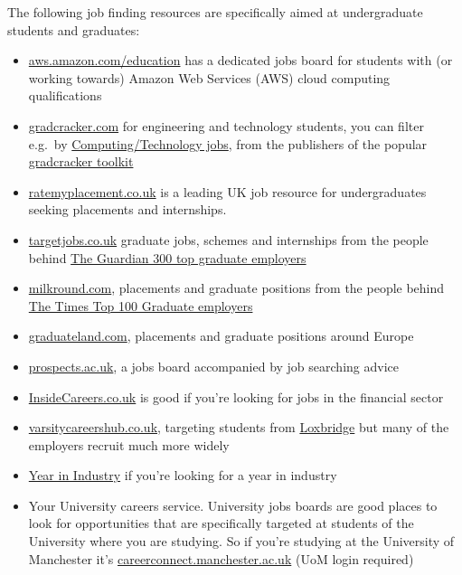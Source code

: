 \documentclass[
]{book}
\providecommand{\tightlist}{%
  \setlength{\itemsep}{0pt}\setlength{\parskip}{0pt}}
\begin{document}
The following job finding resources are specifically aimed at undergraduate students and graduates:

\begin{itemize}
\tightlist
\item
  \href{https://aws.amazon.com/education/awseducate/aws-educate-job-board/}{aws.amazon.com/education} has a dedicated jobs board for students with (or working towards) Amazon Web Services (AWS) cloud computing qualifications
\item
  \href{http://www.gradcracker.com/}{gradcracker.com} for engineering and technology students, you can filter e.g.~by \href{https://www.gradcracker.com/search/computing-technology/jobs}{Computing/Technology jobs}, from the publishers of the popular \href{http://www.gradcracker.com/career-centre/toolkit}{gradcracker toolkit}
\item
  \href{http://www.ratemyplacement.co.uk/}{ratemyplacement.co.uk} is a leading UK job resource for undergraduates seeking placements and internships.
\item
  \href{http://www.targetjobs.co.uk/}{targetjobs.co.uk} graduate jobs, schemes and internships from the people behind \href{https://targetjobs.co.uk/uk300}{The Guardian 300 top graduate employers}
\item
  \href{http://www.milkround.com/}{milkround.com}, placements and graduate positions from the people behind \href{https://digital.top100graduateemployers.com/view/979434180/}{The Times Top 100 Graduate employers}
\item
  \href{https://graduateland.com/}{graduateland.com}, placements and graduate positions around Europe
\item
  \href{https://www.prospects.ac.uk/}{prospects.ac.uk}, a jobs board accompanied by job searching advice
\item
  \href{https://www.insidecareers.co.uk}{InsideCareers.co.uk} is good if you're looking for jobs in the financial sector
\item
  \href{https://www.varsitycareershub.co.uk/}{varsitycareershub.co.uk}, targeting students from \href{https://en.wikipedia.org/wiki/Loxbridge}{Loxbridge} but many of the employers recruit much more widely
\item
  \href{https://www.etrust.org.uk/yini-vacancies}{Year in Industry} if you're looking for a year in industry
\item
  Your University careers service. University jobs boards are good places to look for opportunities that are specifically targeted at students of the University where you are studying. So if you're studying at the University of Manchester it's \href{https://careerconnect.manchester.ac.uk/user/jobs.html}{careerconnect.manchester.ac.uk} (UoM login required)
\end{itemize}
\end{document}
